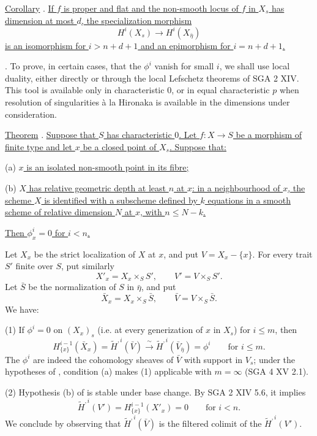 \underline{Corollary} . \underline{If $f$ is proper and flat and the
non-smooth locus of $f$ in $X_s$ has dimension at most $d$, the
specialization morphism}
\[
H^i(X_s)\longrightarrow H^i(X_{\bar\eta})
\]
\underline{is an isomorphism for $i>n+d+1$ and an epimorphism for
$i=n+d+1$.}

. To prove, in certain cases, that the $\phi^i$ vanish for small
$i$, we shall use local duality, either directly or through the local
Lefschetz theorems of SGA 2 XIV. This tool is available only in
characteristic $0$, or in equal characteristic $p$ when resolution of
singularities \`a la Hironaka is available in the dimensions under
consideration.


\underline{Theorem} . \underline{Suppose that $S$ has characteristic
$0$. Let $f:X\longrightarrow S$ be a morphism of finite type and let
$x$ be a closed point of $X_s$. Suppose that:}

(a) \underline{$x$ is an isolated non-smooth point in its fibre;}

(b) \underline{$X$ has relative geometric depth at least $n$ at $x$:
in a neighbourhood of $x$, the scheme $X$ is identified with a
subscheme defined by $k$ equations in a smooth scheme of relative
dimension $N$ at $x$, with $n\leqslant N-k$.}

\underline{Then $\phi^i_x=0$ for $i<n$.}

Let $X_x$ be the strict localization of $X$ at $x$, and put
$V=X_x-\{x\}$. For every trait $S'$ finite over $S$, put similarly
\[
X'_x=X_x\times_S S',\qquad V'=V\times_S S'.
\]
Let $\bar S$ be the normalization of $S$ in $\bar\eta$, and put
\[
\bar X_x=X_x\times_S\bar S,
\qquad \bar V=V\times_S\bar S.
\]
We have:

(1) If $\phi^i=0$ on $(X_x)_s$ (i.e. at every generization of $x$ in
$X_s$) for $i\leqslant m$, then
\begin{equation*}
H^{i-1}_{\{x\}}(\bar X_x)
=\widetilde H^{,i}(\bar V)
\xrightarrow{\ \sim\ }
\widetilde H^{,i}(\bar V_{\bar\eta})
=\phi^i
\qquad\text{for }i\leqslant m.
\end{equation*}
The $\phi^i$ are indeed the cohomology sheaves of $\bar V$ with support
in $V_s$; under the hypotheses of , condition (a) makes (1)
applicable with $m=\infty$ (SGA 4 XV 2.1).

(2) Hypothesis (b) of  is stable under base change. By SGA 2 XIV
5.6, it implies
\begin{equation*}
\widetilde H^{,i}(V')
=H^{i-1}_{\{x\}}(X'_x)=0
\qquad\text{for }i<n.
\end{equation*}
We conclude by observing that $\widetilde H^{,i}(\bar V)$ is the
filtered colimit of the $\widetilde H^{,i}(V')$.

